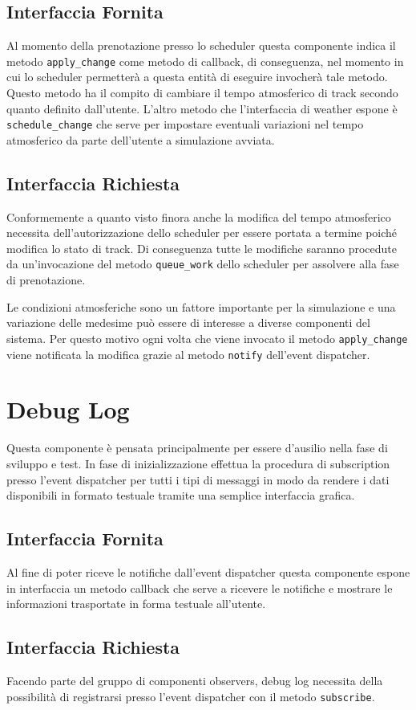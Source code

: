 \documentclass[11pt,a4paper]{report}
\newcommand{\fun}[1]{\texttt{#1}}
\begin{document}
\subsection*{Interfaccia Fornita}
Al momento della prenotazione presso lo scheduler questa componente indica il metodo \fun{apply\_change} come metodo di callback, di conseguenza, nel momento in cui lo scheduler permetterà a questa entità di eseguire invocherà tale metodo. Questo metodo ha il compito di cambiare il tempo atmosferico di track secondo quanto definito dall'utente.
L'altro metodo che l'interfaccia di weather espone è \fun{schedule\_change} che serve per impostare eventuali variazioni nel tempo atmosferico da parte dell'utente a simulazione avviata.
\subsection*{Interfaccia Richiesta}
Conformemente a quanto visto finora anche la modifica del tempo atmosferico necessita dell'autorizzazione dello scheduler per essere portata a termine poiché modifica lo stato di track. Di conseguenza tutte le modifiche saranno procedute da un'invocazione del metodo \fun{queue\_work} dello scheduler per assolvere alla fase di prenotazione.

Le condizioni atmosferiche sono un fattore importante per la simulazione e una variazione delle medesime può essere di interesse a diverse componenti del sistema. Per questo motivo ogni volta che viene invocato il metodo \fun{apply\_change} viene notificata la modifica grazie al metodo \fun{notify} dell'event dispatcher.
\section{Debug Log}
Questa componente è pensata principalmente per essere d'ausilio nella fase di sviluppo e test. In fase di inizializzazione effettua la procedura di subscription presso l'event dispatcher per tutti i tipi di messaggi in modo da rendere i dati disponibili in formato testuale tramite una semplice interfaccia grafica.
\subsection*{Interfaccia Fornita}
Al fine di poter riceve le notifiche dall'event dispatcher questa componente espone in interfaccia un metodo callback che serve a ricevere le notifiche e mostrare le informazioni trasportate in forma testuale all'utente.
\subsection*{Interfaccia Richiesta}
Facendo parte del gruppo di componenti observers, debug log necessita della possibilità di registrarsi presso l'event dispatcher con il metodo \fun{subscribe}.
\end{document}
